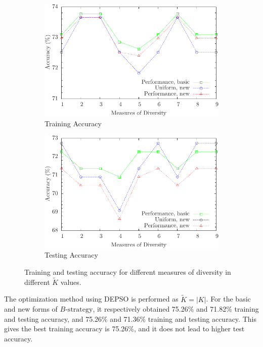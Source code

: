 
\begin{figure} [t]
\centering
\begin{subfigure}{.40\textwidth}
  \centering
  \includegraphics[width=.90\linewidth]{../Figure/diversity_7_others_train}
  \caption{Training Accuracy}
  \label{fig:diversity_0.7_others_train}
\end{subfigure}%
\begin{subfigure}{.40\textwidth}
  \centering
  \includegraphics[width=.90\linewidth]{../Figure/diversity_7_others_test}
  \caption{Testing Accuracy}
  \label{fig:diversity_0.7_others_test}
\end{subfigure}
\caption{Training and testing accuracy for different measures of diversity in different $\tilde{K}$ values.}
\label{fig:diversity_0.7_others}
\end{figure}


The optimization method using DEPSO is performed as $\tilde{K}=|K|$. For the basic and new forms of $B\text{-strategy}$, it respectively obtained 75.26\% and 71.82\% training and testing accuracy, and 75.26\% and 71.36\% training and testing accuracy. This gives the best training accuracy is 75.26\%, and it does not lead to higher test accuracy.

